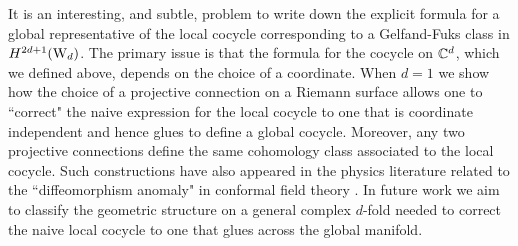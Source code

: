 %


\begin{rmk}
It is an interesting, and subtle, problem to write down the explicit formula for a global representative of the local cocycle corresponding to a Gelfand-Fuks class in $H^{2d+1}({\rm W}_d)$. 
The primary issue is that the formula for the cocycle on $\mathbb C^d$, which we defined above, depends on the choice of a coordinate.
When $d=1$ we show how the choice of a projective connection on a Riemann surface allows one to ``correct" the naive expression for the local cocycle to one that is coordinate independent and hence glues to define a global cocycle.
Moreover, any two projective connections define the same cohomology class associated to the local cocycle.
Such constructions have also appeared in the physics literature related to the ``diffeomorphism anomaly" in conformal field theory \cite{Lazz}. 
In future work we aim to classify the geometric structure on a general complex $d$-fold needed to correct the naive local cocycle to one that glues across the global manifold. 
\end{rmk}


